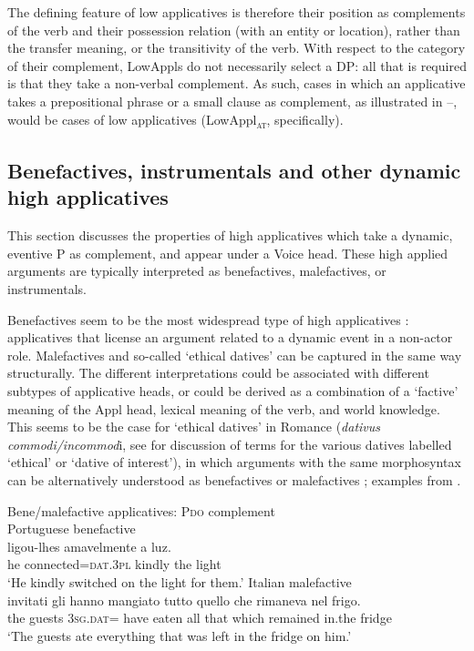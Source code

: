 \documentclass[output=paper,colorlinks,citecolor=brown,nonflat]{./langscibook}
\begin{document}
The defining feature of low applicatives is therefore their position as complements of the verb and their possession relation (with an entity or location), rather than the transfer meaning, or the transitivity of the verb. With respect to the category of their complement, LowAppls do not necessarily select a DP: all that is required is that they take a non-verbal complement. As such, cases in which an applicative takes a prepositional phrase or a small clause as complement, as illustrated in --, would be cases of low applicatives (LowAppl\textsc{\textsubscript{at}}, specifically).

\subsection{Benefactives, instrumentals and other dynamic high applicatives}\label{sec:cuervo:4.2}

This section discusses the properties of high applicatives which take a dynamic, eventive \liv P as complement, and appear under a Voice head. These high applied arguments are typically interpreted as benefactives, malefactives, or instrumentals.

Benefactives seem to be the most widespread type of high applicatives \citep{Polinsky2013}: applicatives that license an argument related to a dynamic event in a non-actor role. Malefactives and so-called ‘ethical datives’ can be captured in the same way structurally. The different interpretations could be associated with different subtypes of applicative heads, or could be derived as a combination of a ‘factive’ meaning of the Appl head, lexical meaning of the verb, and world knowledge. This seems to be the case for ‘ethical datives’ in Romance (\textit{dativus commodi/incommod}i, see \citealt{RobergeTroberg2009} for discussion of terms for the various datives labelled ‘ethical’ or ‘dative of interest’), in which arguments with the same morphosyntax can be alternatively understood as benefactives  or malefactives ; examples from \citealt{RobergeTroberg2009}.

\ea%
    \label{ex:cuervo:9}
    Bene/malefactive applicatives: \liv P\textsc{do} complement\\
    \ea%
        \label{ex:cuervo:9a}
        Portuguese benefactive\\
         {ligou-lhes}   {amavelmente} {a} {luz}.\\
        he   connected=\textsc{dat.3pl} kindly   the light\\
        \glt ‘He kindly switched on the light for them.’
    \ex%
        \label{ex:cuervo:9b}
        Italian malefactive\\
         {invitati} {gli} {hanno} {mangiato} {tutto} {quello} {che} {rimaneva} {nel} {frigo}.\\
         the guests 3\textsc{sg.dat}= have eaten all that which remained in.the fridge\\
        \glt ‘The guests ate everything that was left in the fridge on him.’
    \z
\z
\end{document}
